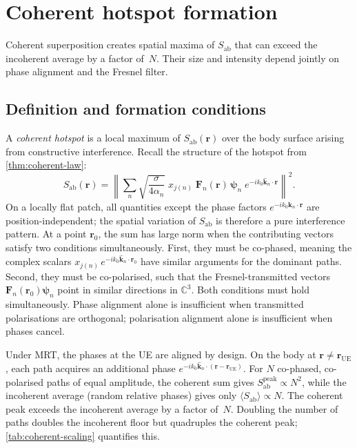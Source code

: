 \documentclass[11pt,a4paper]{article}
\theoremstyle{definition}      %
\newcommand{\rr}{\mathbf{r}}
\newcommand{\Sab}{S_{\mathrm{ab}}}
\begin{document}
\section{Coherent hotspot formation}\label{sec:coherent-hotspot}

Coherent superposition creates spatial maxima of $\Sab$ that can
exceed the incoherent average by a factor of~$N$.  Their size and
intensity depend jointly on phase alignment and the Fresnel filter.

\subsection{Definition and formation conditions}\label{sec:hotspot-def}

A \emph{coherent hotspot} is a local maximum of $\Sab(\rr)$ over
the body surface arising from constructive interference.  Recall the structure
of the hotspot from \cref{thm:coherent-law}:
\begin{equation}\label{eq:Sab-hotspot}
  \Sab(\rr) = \left\|\sum_{n}
  \sqrt{\frac{\sigma}{4\alpha_n}}\;x_{j(n)}\;
  \mathbf{F}_n(\rr)\,\boldsymbol{\psi}_n\;
  e^{-ik_0\hat{\mathbf{k}}_n\cdot\rr}\right\|^2.
\end{equation}
On a locally flat patch, all quantities except the phase factors
$e^{-ik_0\hat{\mathbf{k}}_n\cdot\rr}$ are position-independent;
the spatial variation of $\Sab$ is therefore a pure interference
pattern.  At a point $\rr_0$, the sum has large
norm when the contributing vectors satisfy two conditions simultaneously.
First, they must be co-phased, meaning the complex scalars
$x_{j(n)}\,e^{-ik_0\hat{\mathbf{k}}_n\cdot\rr_0}$ have similar
arguments for the dominant paths.
Second, they must be co-polarised, such that the Fresnel-transmitted vectors
$\mathbf{F}_n(\rr_0)\boldsymbol{\psi}_n$ point in similar
directions in $\mathbb{C}^3$.
Both conditions must hold simultaneously.  Phase alignment alone is
insufficient when transmitted polarisations are orthogonal; polarisation
alignment alone is insufficient when phases cancel.

Under MRT, the phases at the UE are aligned by design.  On the body
at $\rr \neq \rr_\mathrm{UE}$, each path acquires an additional phase
$e^{-ik_0\hat{\mathbf{k}}_n\cdot(\rr - \rr_\mathrm{UE})}$. For $N$ co-phased, co-polarised paths of equal amplitude, the
coherent sum gives $\Sab^\mathrm{peak} \propto N^2$, while the
incoherent average (random relative phases) gives only
$\langle\Sab\rangle \propto N$.  The coherent peak exceeds the
incoherent average by a factor of~$N$.  Doubling the number of paths
doubles the incoherent floor but quadruples the coherent peak;
\cref{tab:coherent-scaling} quantifies this.
\end{document}
